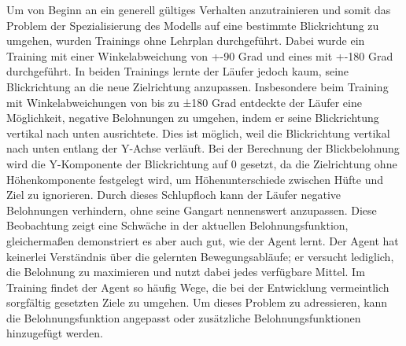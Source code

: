 Um von Beginn an ein generell gültiges Verhalten anzutrainieren und somit das Problem der Spezialisierung des Modells auf eine bestimmte Blickrichtung zu umgehen, wurden Trainings ohne Lehrplan durchgeführt. Dabei wurde ein Training mit einer Winkelabweichung von +-90 Grad und eines mit +-180 Grad durchgeführt. In beiden Trainings lernte der Läufer jedoch kaum, seine Blickrichtung an die neue Zielrichtung anzupassen. Insbesondere beim Training mit Winkelabweichungen von bis zu ±180 Grad entdeckte der Läufer eine Möglichkeit, negative Belohnungen zu umgehen, indem er seine Blickrichtung vertikal nach unten ausrichtete. Dies ist möglich, weil die Blickrichtung vertikal nach unten entlang der Y-Achse verläuft. Bei der Berechnung der Blickbelohnung wird die Y-Komponente der Blickrichtung auf 0 gesetzt, da die Zielrichtung ohne Höhenkomponente festgelegt wird, um Höhenunterschiede zwischen Hüfte und Ziel zu ignorieren. Durch dieses Schlupfloch kann der Läufer negative Belohnungen verhindern, ohne seine Gangart nennenswert anzupassen. Diese Beobachtung zeigt eine Schwäche in der aktuellen Belohnungsfunktion, gleichermaßen demonstriert es aber auch gut, wie der Agent lernt. Der Agent hat keinerlei Verständnis über die gelernten Bewegungsabläufe; er versucht lediglich, die Belohnung zu maximieren und nutzt dabei jedes verfügbare Mittel. Im Training findet der Agent so häufig Wege, die bei der Entwicklung vermeintlich sorgfältig gesetzten Ziele zu umgehen. Um dieses Problem zu adressieren, kann die Belohnungsfunktion angepasst oder zusätzliche Belohnungsfunktionen hinzugefügt werden.

